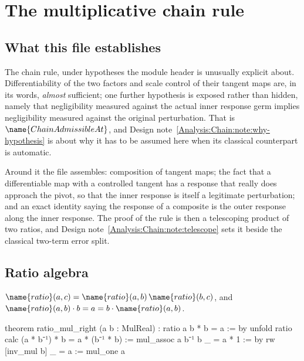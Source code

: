 
\section{The multiplicative chain rule}
\label{Analysis:Chain:sec}


\subsection*{What this file establishes}

The chain rule, under hypotheses the module header is unusually explicit
about.  Differentiability of the two factors and scale control of their tangent
maps are, in its words, \emph{almost} sufficient; one further hypothesis is
exposed rather than hidden, namely that negligibility measured against the
actual inner response germ implies negligibility measured against the original
perturbation.  That is $\name{ChainAdmissibleAt}$, and
Design note~\ref{Analysis:Chain:note:why-hypothesis} is about why it has to be
assumed here when its classical counterpart is automatic.

Around it the file assembles: composition of tangent maps; the fact that a
differentiable map with a controlled tangent has a response that really does
approach the pivot, so that the inner response is itself a legitimate
perturbation; and an exact identity saying the response of a composite is the
outer response along the inner response.  The proof of the rule is then a
telescoping product of two ratios, and
Design note~\ref{Analysis:Chain:note:telescope} sets it beside the classical
two-term error split.

\subsection{Ratio algebra}

\begin{lemma}\label{Analysis:Chain:lem:ratio}
$\name{ratio}(a,c) = \name{ratio}(a,b)\,\name{ratio}(b,c)$, and
$\name{ratio}(a,b) \cdot b = a = b \cdot \name{ratio}(a,b)$.
\end{lemma}

\begin{leancode}
theorem ratio_mul_right (a b : MulReal) :
    ratio a b * b = a := by
  unfold ratio
  calc
    (a * b⁻¹) * b = a * (b⁻¹ * b) := mul_assoc a b⁻¹ b
    _ = a * 1 := by rw [inv_mul b]
    _ = a := mul_one a
\end{leancode}

